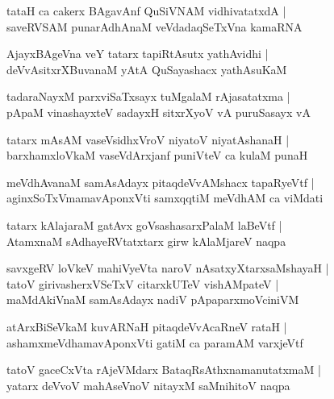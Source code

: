 \documentclass[twoside,12pt,openright]{book}
\newcounter{shloka}[chapter]
\begin{document}
\begin{shloka}
tataH  ca cakerx BAgavAnf QuSiVNAM vidhivatatxdA |\\
saveRVSAM punarAdhAnaM veVdadaqSeTxVna kamaRNA 
\end{shloka}

\begin{shloka}
AjayxBAgeVna veY tatarx tapiRtAsutx yathAvidhi |\\
deVvAsitxrXBuvanaM yAtA QuSayashacx yathAsuKaM 
\end{shloka}

\begin{shloka}
tadaraNayxM parxviSaTxsayx tuMgalaM rAjasatatxma |\\
pApaM vinashayxteV sadayxH sitxrXyoV vA puruSasayx vA 
\end{shloka}

\begin{shloka}
tatarx mAsAM  vaseVsidhxVroV niyatoV niyatAshanaH |\\
barxhamxloVkaM vaseVdArxjanf puniVteV ca kulaM punaH 
\end{shloka}

\begin{shloka}
meVdhAvanaM samAsAdayx pitaqdeVvAMshacx  tapaRyeVtf |\\
aginxSoTxVmamavAponxVti samxqqtiM meVdhAM ca viMdati 
\end{shloka}

\begin{shloka}
tatarx kAlajaraM gatAvx goVsashasarxPalaM laBeVtf |\\
AtamxnaM sAdhayeRVtatxtarx girw kAlaMjareV naqpa
\end{shloka}

\begin{shloka}
savxgeRV loVkeV mahiVyeVta naroV nAsatxyXtarxsaMshayaH |\\
tatoV girivasherxVSeTxV citarxkUTeV vishAMpateV |\\
maMdAkiVnaM samAsAdayx nadiV pApaparxmoVciniVM
\end{shloka}

\begin{shloka}
atArxBiSeVkaM kuvARNaH pitaqdeVvAcaRneV rataH |\\
ashamxmeVdhamavAponxVti gatiM ca paramAM varxjeVtf 
\end{shloka}

\begin{shloka}
tatoV gaceCxVta rAjeVMdarx BataqRsAthxnamanutatxmaM |\\
yatarx deVvoV mahAseVnoV nitayxM saMnihitoV naqpa 
\end{shloka}
\end{document}
